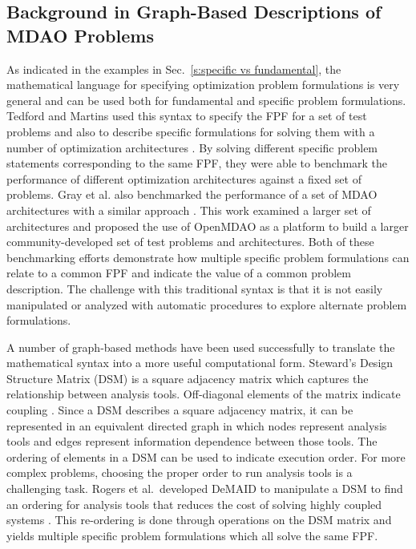 \subsection{Background in Graph-Based Descriptions of MDAO Problems}
	\label{s:existing syntax}
    As indicated in the examples in Sec.~\ref{s:specific vs fundamental}, the mathematical 
    language for specifying optimization problem formulations is very general and can be used both for 
    fundamental and specific problem formulations. Tedford and Martins used this syntax to specify the 
    FPF for a set of test problems and also to describe specific formulations for solving them with a 
    number of optimization architectures \cite{Tedford2009}. By solving different specific problem statements corresponding to the same FPF, they were able to  benchmark the performance of different optimization architectures against a fixed set of 
    problems. Gray et al. also benchmarked the performance of a set of MDAO architectures  with a similar approach \cite{Gray2013}. 
    This work examined a larger set of architectures and proposed the use of OpenMDAO as a platform to build a larger community-developed set of test problems and architectures. Both of these benchmarking efforts 
    demonstrate how multiple specific problem formulations can relate to a common FPF and indicate the 
    value of a common problem description. The challenge with this 
    traditional syntax is that it is not easily manipulated or analyzed with automatic procedures to explore alternate problem formulations. 

    A number of graph-based methods have been used successfully to translate the 
    mathematical syntax into a more useful computational form. 
    Steward's Design Structure Matrix (DSM) is a square adjacency matrix which captures the relationship between analysis tools.
    Off-diagonal elements of the matrix indicate coupling \cite{Steward1981}. Since a DSM describes a square adjacency matrix, 
    it can be represented in an equivalent directed graph in which nodes represent analysis tools and 
    edges represent information dependence between those tools. The ordering of elements in a DSM can be used to indicate 
    execution order.  For more complex problems, choosing the proper order to run analysis tools is a challenging task. 
    Rogers et al.~developed DeMAID to manipulate a DSM to find an ordering for analysis tools that 
    reduces the cost of solving highly coupled systems \cite{rogers1996,rogers1996demaid}. This re-ordering is done through 
    operations on the DSM matrix and yields multiple specific problem 
    formulations which all solve the same FPF. 
    
